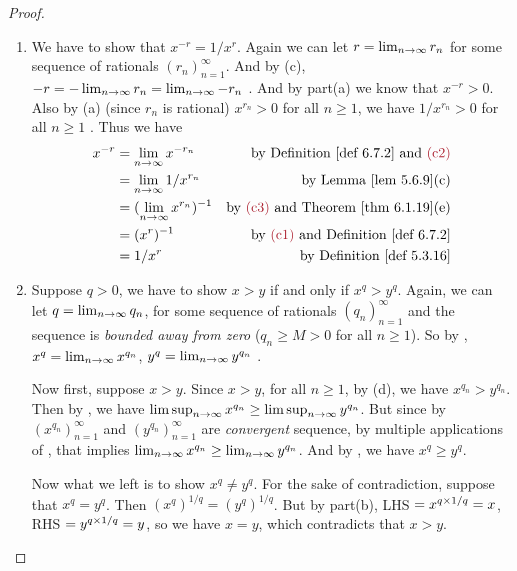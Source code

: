 \begin{proof}
\begin{enumerate}
\item
    We have to show that \(x^{-r} = 1/x^r\).
    Again we can let \(r = \lim_{n \to \infty} r_n\)  for some sequence of rationals \((r_n)_{n = 1}^{\infty}\).
    And by (c), \(-r = -\lim_{n \to \infty} r_n = \lim_{n \to \infty} -r_n\) .
    And by part(a) we know that \(x^{-r} > 0\).
    Also by (a) (since \(r_n\) is rational) \(x^{r_n} > 0\) for all \(n \ge 1\), we have \(1/x^{r_n} > 0\) for all \(n \ge 1\) .
    Thus we have
    \begin{align*}
        x^{-r} & = \lim_{n \toINF} x^{-r_n} & \text{by \DEF{6.7.2} and \MAROON{(c2)}} \\
               & = \lim_{n \toINF} 1/x^{r_n} & \text{by \LEM{5.6.9}(c)} \\
               & = (\lim_{n \toINF} x^{r_n})^{-1} & \text{by \MAROON{(c3)} and \THM{6.1.19}(e)} \\
               & = (x^r)^{-1} & \text{by \MAROON{(c1)} and \DEF{6.7.2}}\\
               & = 1/x^r & \text{by \DEF{5.3.16}}
    \end{align*}
\item
    Suppose \(q > 0\), we have to show \(x > y\) if and only if \(x^q > y^q\).
    Again, we can let \(q = \lim_{n \to \infty} q_n\), for some sequence of rationals \((q_n)_{n = 1}^{\infty}\) and the sequence is \emph{bounded away from zero} (\(q_n \ge M > 0\) for all \(n \ge 1\)).
    So by , \(x^q = \lim_{n \to \infty} x^{q_n}\), \(y^q = \lim_{n \to \infty} y^{q_n}\) .
    
    Now first, suppose \(x > y\).
    Since \(x > y\), for all \(n \ge 1\), by (d), we have \(x^{q_n} > y^{q_n}\).
    Then by , we have \(\limsup_{n \to \infty} x^{q_n} \ge \limsup_{n \to \infty} y^{q_n}\).
    But since by  \((x^{q_n})_{n = 1}^{\infty}\) and \((y^{q_n})_{n = 1}^{\infty}\) are \emph{convergent} sequence, by multiple applications of , that implies \(\lim_{n \to \infty} x^{q_n} \ge \lim_{n \to \infty} y^{q_n}\).
    And by , we have \(x^q \ge y^q\).
    
    Now what we left is to show \(x^q \ne y^q\).
    For the sake of contradiction, suppose that \(x^q = y^q\).
    Then \((x^q)^{1/q} = (y^q)^{1/q}\).
    But by part(b), LHS \(= x^{q \times 1/q} = x\), RHS \(= y^{q \times 1/q} = y\), so we have \(x = y\), which contradicts that \(x > y\).
    

\end{enumerate}
\end{proof}

